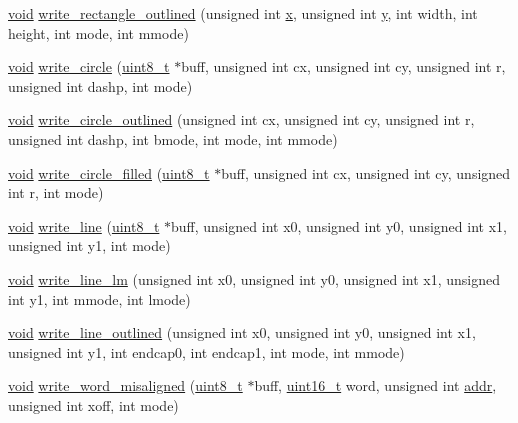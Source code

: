 \begin{DoxyCompactItemize}
\item 
\hyperlink{group___n_a_m_e_ga18028b8badbf1ea7e704ccac3c488e82}{void} \hyperlink{group___o_s_d_g_e_n_module_ga761aea940799fbd6d4f6bafe83ea2032}{write\-\_\-rectangle\-\_\-outlined} (unsigned int \hyperlink{pios__opahrs__proto_8h_ad0da36b2558901e21e7a30f6c227a45e}{x}, unsigned int \hyperlink{pios__opahrs__proto_8h_aa4f0d3eebc3c443f9be81bf48561a217}{y}, int width, int height, int mode, int mmode)
\item 
\hyperlink{group___n_a_m_e_ga18028b8badbf1ea7e704ccac3c488e82}{void} \hyperlink{group___o_s_d_g_e_n_module_ga634e8149f811d4bb090d50b25064907c}{write\-\_\-circle} (\hyperlink{stdint_8h_aba7bc1797add20fe3efdf37ced1182c5}{uint8\-\_\-t} $\ast$buff, unsigned int cx, unsigned int cy, unsigned int r, unsigned int dashp, int mode)
\item 
\hyperlink{group___n_a_m_e_ga18028b8badbf1ea7e704ccac3c488e82}{void} \hyperlink{group___o_s_d_g_e_n_module_gaa58af239ed159652cb196f745c79d9a6}{write\-\_\-circle\-\_\-outlined} (unsigned int cx, unsigned int cy, unsigned int r, unsigned int dashp, int bmode, int mode, int mmode)
\item 
\hyperlink{group___n_a_m_e_ga18028b8badbf1ea7e704ccac3c488e82}{void} \hyperlink{group___o_s_d_g_e_n_module_gaf369bd7c0a15859e4a35ac7a6bf77263}{write\-\_\-circle\-\_\-filled} (\hyperlink{stdint_8h_aba7bc1797add20fe3efdf37ced1182c5}{uint8\-\_\-t} $\ast$buff, unsigned int cx, unsigned int cy, unsigned int r, int mode)
\item 
\hyperlink{group___n_a_m_e_ga18028b8badbf1ea7e704ccac3c488e82}{void} \hyperlink{group___o_s_d_g_e_n_module_ga2fe2ee0f0ff8e34091a5357658c686c1}{write\-\_\-line} (\hyperlink{stdint_8h_aba7bc1797add20fe3efdf37ced1182c5}{uint8\-\_\-t} $\ast$buff, unsigned int x0, unsigned int y0, unsigned int x1, unsigned int y1, int mode)
\item 
\hyperlink{group___n_a_m_e_ga18028b8badbf1ea7e704ccac3c488e82}{void} \hyperlink{group___o_s_d_g_e_n_module_ga1b12386d924769809d25c0151ca7d47f}{write\-\_\-line\-\_\-lm} (unsigned int x0, unsigned int y0, unsigned int x1, unsigned int y1, int mmode, int lmode)
\item 
\hyperlink{group___n_a_m_e_ga18028b8badbf1ea7e704ccac3c488e82}{void} \hyperlink{group___o_s_d_g_e_n_module_ga27afef3cac2fe7bd07005b4cfdab1297}{write\-\_\-line\-\_\-outlined} (unsigned int x0, unsigned int y0, unsigned int x1, unsigned int y1, int endcap0, int endcap1, int mode, int mmode)
\item 
\hyperlink{group___n_a_m_e_ga18028b8badbf1ea7e704ccac3c488e82}{void} \hyperlink{group___o_s_d_g_e_n_module_ga609b93e9b64ad8b92c1c555d3cdb80c5}{write\-\_\-word\-\_\-misaligned} (\hyperlink{stdint_8h_aba7bc1797add20fe3efdf37ced1182c5}{uint8\-\_\-t} $\ast$buff, \hyperlink{stdint_8h_a273cf69d639a59973b6019625df33e30}{uint16\-\_\-t} word, unsigned int \hyperlink{group___c_m_s_i_s___core___instruction_interface_gae5c31572d72f992f107a67f7c4e80d5b}{addr}, unsigned int xoff, int mode)

\end{DoxyCompactItemize}
